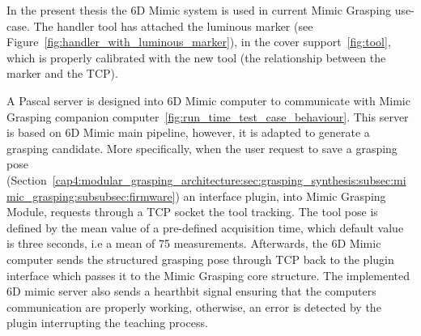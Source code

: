 In the present thesis the 6D Mimic system is used in current Mimic Grasping use-case. The handler tool has attached the luminous marker (see Figure~\ref{fig:handler_with_luminous_marker}),  in the cover support~\ref{fig:tool}, which is properly calibrated with the new tool (the relationship between the marker and the TCP).

\begin{figure}[h!]
\end{figure}

A Pascal server is designed into 6D Mimic computer to communicate with Mimic Grasping companion computer~\ref{fig:run_time_test_case_behaviour}. This server is based on 6D Mimic main pipeline, however, it is adapted to generate a grasping candidate. More specifically, when the user request to save a grasping pose (Section~\ref{cap4:modular_grasping_architecture:sec:grasping_synthesis:subsec:mimic_grasping:subsubsec:firmware}) an interface plugin, into Mimic Grasping Module, requests through a \ac{TCP} socket the tool tracking.  The tool pose is defined by the mean value of a pre-defined acquisition time, which default value is three seconds, i.e a mean of 75 measurements. Afterwards, the 6D Mimic computer sends the structured grasping pose through \ac{TCP} back to the plugin interface which passes it to the Mimic Grasping core structure. The implemented 6D mimic server also sends a hearthbit signal ensuring that the computers communication are properly working, otherwise, an error is detected by the plugin interrupting the teaching process.



